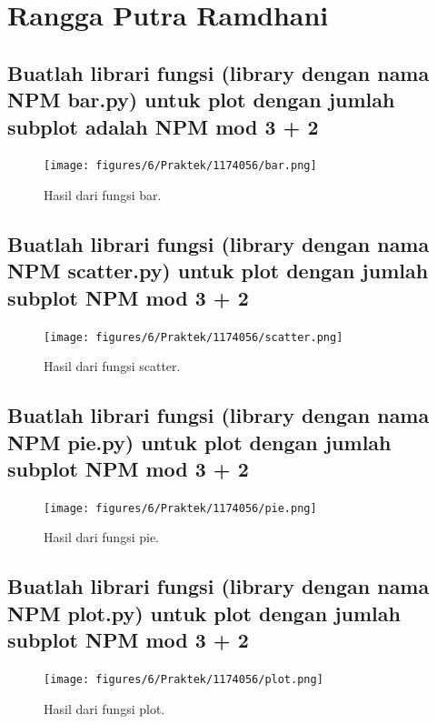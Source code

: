 \section{Rangga Putra Ramdhani}
\subsection{Buatlah librari fungsi (library dengan nama NPM bar.py) untuk plot dengan jumlah subplot adalah NPM mod 3 + 2}

\begin{figure}[H]
	\texttt{[image: figures/6/Praktek/1174056/bar.png]}
	\caption{Hasil dari fungsi bar.}
	\centering
\end{figure}

\subsection{Buatlah librari fungsi (library dengan nama NPM scatter.py) untuk plot dengan jumlah subplot NPM mod 3 + 2}

\begin{figure}[H]
	\texttt{[image: figures/6/Praktek/1174056/scatter.png]}
	\caption{Hasil dari fungsi scatter.}
	\centering
\end{figure}

\subsection{Buatlah librari fungsi (library dengan nama NPM pie.py) untuk plot dengan jumlah subplot NPM mod 3 + 2}

\begin{figure}[H]
	\texttt{[image: figures/6/Praktek/1174056/pie.png]}
	\caption{Hasil dari fungsi pie.}
	\centering
\end{figure}

\subsection{Buatlah librari fungsi (library dengan nama NPM plot.py) untuk plot dengan jumlah subplot NPM mod 3 + 2}

\begin{figure}[H]
	\texttt{[image: figures/6/Praktek/1174056/plot.png]}
	\caption{Hasil dari fungsi plot.}
	\centering
\end{figure}

